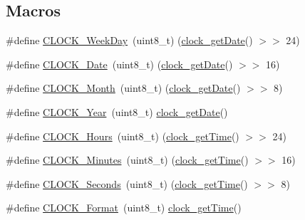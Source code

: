 \subsection*{Macros}
\begin{DoxyCompactItemize}
\item 
\#define \hyperlink{group___c_l_o_c_k___value_ga41cab09c59fe3cc9a25719ec3be3fd4d}{C\+L\+O\+C\+K\+\_\+\+Week\+Day}~(uint8\+\_\+t) (\hyperlink{group___clock___time___date_gabb4d72928cb3d131d40067fb141003aa}{clock\+\_\+get\+Date}() $>$$>$ 24)
\item 
\#define \hyperlink{group___c_l_o_c_k___value_ga483cf87b93faab3c148b7933391acba0}{C\+L\+O\+C\+K\+\_\+\+Date}~(uint8\+\_\+t) (\hyperlink{group___clock___time___date_gabb4d72928cb3d131d40067fb141003aa}{clock\+\_\+get\+Date}() $>$$>$ 16)
\item 
\#define \hyperlink{group___c_l_o_c_k___value_gabd717170aa836b16355413e2c5ca0ad8}{C\+L\+O\+C\+K\+\_\+\+Month}~(uint8\+\_\+t) (\hyperlink{group___clock___time___date_gabb4d72928cb3d131d40067fb141003aa}{clock\+\_\+get\+Date}() $>$$>$ 8)
\item 
\#define \hyperlink{group___c_l_o_c_k___value_ga35866274a21e8d3c0223c465209f3d74}{C\+L\+O\+C\+K\+\_\+\+Year}~(uint8\+\_\+t) \hyperlink{group___clock___time___date_gabb4d72928cb3d131d40067fb141003aa}{clock\+\_\+get\+Date}()
\item 
\#define \hyperlink{group___c_l_o_c_k___value_ga49ea807900604714bab70a531081ac6a}{C\+L\+O\+C\+K\+\_\+\+Hours}~(uint8\+\_\+t) (\hyperlink{group___clock___time___date_ga03ae6948083c259f6edc0b146f40dc62}{clock\+\_\+get\+Time}() $>$$>$ 24)
\item 
\#define \hyperlink{group___c_l_o_c_k___value_ga302d9ee9e79c96969e558b9ffdba3212}{C\+L\+O\+C\+K\+\_\+\+Minutes}~(uint8\+\_\+t) (\hyperlink{group___clock___time___date_ga03ae6948083c259f6edc0b146f40dc62}{clock\+\_\+get\+Time}() $>$$>$ 16)
\item 
\#define \hyperlink{group___c_l_o_c_k___value_ga4c539bc50b05addb6629dfea687d65b7}{C\+L\+O\+C\+K\+\_\+\+Seconds}~(uint8\+\_\+t) (\hyperlink{group___clock___time___date_ga03ae6948083c259f6edc0b146f40dc62}{clock\+\_\+get\+Time}() $>$$>$ 8)
\item 
\#define \hyperlink{group___c_l_o_c_k___value_gafec8368ed05e06cadccc3becf2cd0ead}{C\+L\+O\+C\+K\+\_\+\+Format}~(uint8\+\_\+t) \hyperlink{group___clock___time___date_ga03ae6948083c259f6edc0b146f40dc62}{clock\+\_\+get\+Time}()
\end{DoxyCompactItemize}


